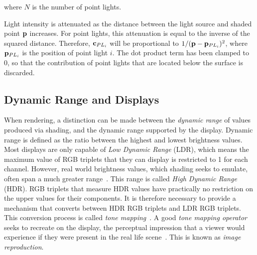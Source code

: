 where \begin{math}N\end{math} is the number of point lights.

Light intensity is attenuated as the distance between the light source and shaded point \begin{math}\mathbf{p}\end{math} increases. For point lights, this attenuation is equal to the inverse of the squared distance. Therefore, \begin{math}\mathbf{c}_{PL_i}\end{math} will be proportional to \begin{math}1 / (\mathbf{p} - \mathbf{p}_{PL_i})^2\end{math}, where \begin{math}\mathbf{p}_{PL_i}\end{math} is the position of point light \begin{math}i\end{math}. The dot product term has been clamped to 0, so that the contribution of point lights that are located below the surface is discarded.

\subsection{Dynamic Range and Displays} \label{DynamicRangeAndDisplays}

When rendering, a distinction can be made between the \textit{dynamic range} of values produced via shading, and the dynamic range supported by the display. Dynamic range is defined as the ratio between the highest and lowest brightness values. Most displays are only capable of \textit{Low Dynamic Range} (LDR), which means the maximum value of RGB triplets that they can display is restricted to 1 for each channel. However, real world brightness values, which shading seeks to emulate, often span a much greater range~\cite{Reinhard}. This range is called \textit{High Dynamic Range} (HDR). RGB triplets that measure HDR values have practically no restriction on the upper values for their components. It is therefore necessary to provide a mechanism that converts between HDR RGB triplets and LDR RGB triplets. This conversion process is called \textit{tone mapping}~\cite{HoffmanKeynoteEchoChamber}. A good \textit{tone mapping operator} seeks to recreate on the display, the perceptual impression that a viewer would experience if they were present in the real life scene~\cite{HoffmanKeynoteEchoChamber}. This is known as \textit{image reproduction}.

